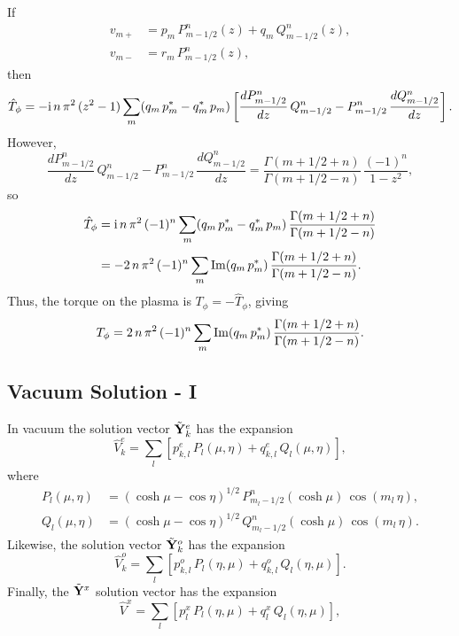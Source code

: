 \documentclass[12pt,prb,aps,notitlepage]{revtex4-1}
\begin{document}
If
\begin{align}
v_{m+} &= p_m\,P_{m-1/2}^n(z)+ q_m\,Q_{m-1/2}^n(z),\\[0.5ex]
v_{m-} &= r_m\,P_{m-1/2}^n(z),
\end{align}
then
\begin{equation}
\hat{T}_\phi = -{\rm i}\,n\,\pi^2\,(z^2-1)\sum_m (q_m\,p_m^\ast-q_m^\ast\,p_m)\left[
\frac{dP_{m-1/2}^n}{dz}\, Q_{m-1/2}^n - P_{m-1/2}^n\,\frac{dQ_{m-1/2}^n}{dz}\right].
\end{equation}
However,
\begin{equation}
\frac{dP_{m-1/2}^n}{dz}\, Q_{m-1/2}^n - P_{m-1/2}^n\,\frac{dQ_{m-1/2}^n}{dz}= \frac{\Gamma(m+1/2+n)}{\Gamma(m+1/2-n)}\,\frac{(-1)^n}{1-z^2},
\end{equation}
so
\begin{align}
\hat{T}_\phi &= {\rm i}\,n\,\pi^2\,(-1)^n\sum_m (q_m\,p_m^\ast-q_m^\ast\,p_m)\,\frac{\Gamma(m+1/2+n)}{\Gamma(m+1/2-n)}\nonumber\\[0.5ex]
&= -2\,n\,\pi^2\,(-1)^n\sum_m {\rm Im}(q_m\,p_m^\ast)\,\frac{\Gamma(m+1/2+n)}{\Gamma(m+1/2-n)}.
\end{align}
Thus, the torque on the plasma is $T_\phi = -\hat{T}_\phi$, giving
\begin{equation}
T_\phi =2\,n\,\pi^2\,(-1)^n\sum_m {\rm Im}(q_m\,p_m^\ast)\,\frac{\Gamma(m+1/2+n)}{\Gamma(m+1/2-n)}.
\end{equation}

\subsection{Vacuum Solution - I}
In vacuum the solution vector $\tilde{\bf Y}_k^e$ has the expansion
\begin{equation}
\hat{V}_k^e = \sum_l\left[p_{k,l}^e\,P_l(\mu,\eta) + q_{k,l}^e\,Q_l(\mu,\eta)\right],
\end{equation}
where
\begin{align}
P_l(\mu,\eta) &=(\cosh\mu-\cos\eta)^{1/2}\,P_{m_l-1/2}^n(\cosh\mu)\,\cos(m_l\,\eta),\\[0.5ex]
Q_l(\mu,\eta) &=(\cosh\mu-\cos\eta)^{1/2}\,Q_{m_l-1/2}^n(\cosh\mu)\,\cos(m_l\,\eta).
\end{align}
Likewise, the solution vector $\tilde{\bf Y}_k^o$ has the expansion
\begin{equation}
\hat{V}_k^o = \sum_l \left[p_{k,l}^o\,P_l(\eta,\mu)+q_{k,l}^o\,Q_l(\eta,\mu)\right].
\end{equation}
Finally, the $\tilde{\bf Y}^x$ solution vector has the expansion
\begin{equation}
\hat{V}^x = \sum_l \left[p_l^x\,P_l(\eta,\mu)+ q_l^x\,Q_l(\eta,\mu)\right],
\end{equation}
\end{document}
